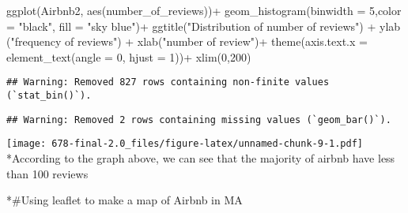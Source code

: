 \documentclass[
]{article}
\newenvironment{Shaded}{\begin{snugshade}}{\end{snugshade}}
\newcommand{\AttributeTok}[1]{\textcolor[rgb]{0.77,0.63,0.00}{#1}}
\newcommand{\DecValTok}[1]{\textcolor[rgb]{0.00,0.00,0.81}{#1}}
\newcommand{\FunctionTok}[1]{\textcolor[rgb]{0.00,0.00,0.00}{#1}}
\newcommand{\NormalTok}[1]{#1}
\newcommand{\OtherTok}[1]{\textcolor[rgb]{0.56,0.35,0.01}{#1}}
\newcommand{\SpecialCharTok}[1]{\textcolor[rgb]{0.00,0.00,0.00}{#1}}
\newcommand{\StringTok}[1]{\textcolor[rgb]{0.31,0.60,0.02}{#1}}
\begin{document}
\begin{Shaded}
\begin{Highlighting}[]
\FunctionTok{ggplot}\NormalTok{(Airbnb2, }\FunctionTok{aes}\NormalTok{(number\_of\_reviews))}\SpecialCharTok{+} \FunctionTok{geom\_histogram}\NormalTok{(}\AttributeTok{binwidth =} \DecValTok{5}\NormalTok{,}\AttributeTok{color =} \StringTok{"black"}\NormalTok{, }\AttributeTok{fill =} \StringTok{"sky blue"}\NormalTok{)}\SpecialCharTok{+} \FunctionTok{ggtitle}\NormalTok{(}\StringTok{"Distribution of number of reviews"}\NormalTok{) }\SpecialCharTok{+} \FunctionTok{ylab}\NormalTok{ (}\StringTok{"frequency of reviews"}\NormalTok{) }\SpecialCharTok{+} \FunctionTok{xlab}\NormalTok{(}\StringTok{"number of review"}\NormalTok{)}\SpecialCharTok{+} \FunctionTok{theme}\NormalTok{(}\AttributeTok{axis.text.x =} \FunctionTok{element\_text}\NormalTok{(}\AttributeTok{angle =} \DecValTok{0}\NormalTok{, }\AttributeTok{hjust =} \DecValTok{1}\NormalTok{))}\SpecialCharTok{+} \FunctionTok{xlim}\NormalTok{(}\DecValTok{0}\NormalTok{,}\DecValTok{200}\NormalTok{)}
\end{Highlighting}
\end{Shaded}

\begin{verbatim}
## Warning: Removed 827 rows containing non-finite values (`stat_bin()`).
\end{verbatim}

\begin{verbatim}
## Warning: Removed 2 rows containing missing values (`geom_bar()`).
\end{verbatim}

\texttt{[image: 678-final-2.0\_files/figure-latex/unnamed-chunk-9-1.pdf]}
*According to the graph above, we can see that the majority of airbnb
have less than 100 reviews

*\#Using leaflet to make a map of Airbnb in MA

\begin{Shaded}
\end{Shaded}
\end{document}
